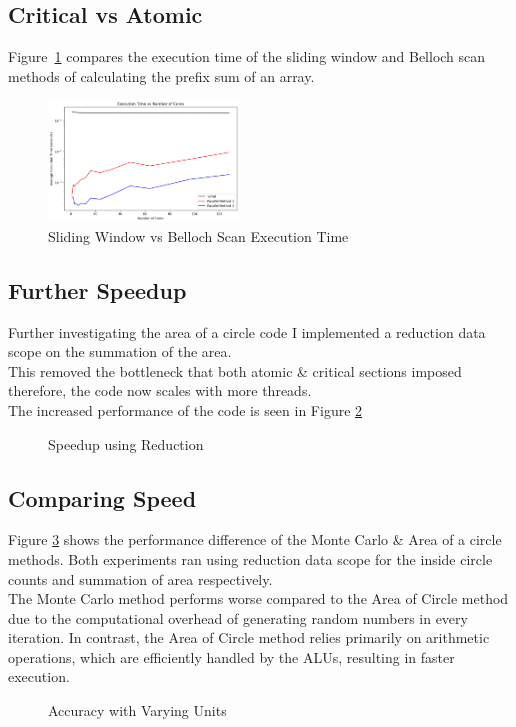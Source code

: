 \documentclass[conference]{IEEEtran}
\begin{document}
\subsection{Critical vs Atomic}
Figure~\ref{fig:prefix} compares the execution time of the sliding window and Belloch scan methods of calculating the prefix sum of an array.
\begin{figure}[H]
    \centering
    \includegraphics[width=0.45\textwidth]{../img/prefix.png}
    \caption{Sliding Window vs Belloch Scan Execution Time}
    \label{fig:prefix}
\end{figure}

\subsection{Further Speedup}
Further investigating the area of a circle code I implemented a reduction data scope on the summation of the area. \\
This removed the bottleneck that both atomic \& critical sections imposed therefore, the code now scales with more threads. \\
The increased performance of the code is seen in Figure \ref{fig:speedup} 

\begin{figure}[H]
    \centering
    \caption{Speedup using Reduction}
    \label{fig:speedup}
\end{figure}

\subsection{Comparing Speed}
Figure \ref{fig:comparingspeed} shows the performance difference of the Monte Carlo \& Area of a circle methods. Both experiments ran using reduction data scope for the inside circle counts and summation of area respectively.\\
The Monte Carlo method performs worse compared to the Area of Circle method due to the computational overhead of generating random numbers in every iteration. In contrast, the Area of Circle method relies primarily on arithmetic operations, which are efficiently handled by the ALUs, resulting in faster execution.\begin{figure}[H]

    \centering
    \caption{Accuracy with Varying Units}
    \label{fig:comparingspeed}
\end{figure}
\end{document}
